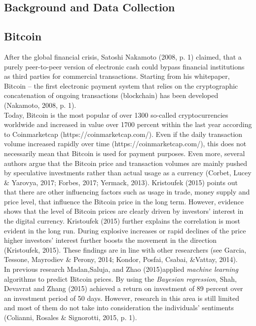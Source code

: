\documentclass[a4paper,american,12pt]{article}
\begin{document}
\begin{spacing}{1.2}
\clearpage

\section{Background and Data Collection}
\label{sec:Background}
\subsection{Bitcoin}
After the global financial crisis, Satoshi Nakamoto (2008, p. 1) claimed, that a purely peer-to-peer version of electronic cash could bypass financial institutions as third parties for commercial transactions. Starting from his whitepaper, Bitcoin – the first electronic payment system that relies on the cryptographic concatenation of ongoing transactions (blockchain) has been developed (Nakamoto, 2008, p. 1).\\

Today, Bitcoin is the most popular of over 1300 so-called cryptocurrencies worldwide and increased in value over 1700 percent within the last year according to Coinmarketcap (https://coinmarketcap.com/). Even if the daily transaction volume increased rapidly over time (https://coinmarketcap.com/), this does not necessarily mean that Bitcoin is used for payment purposes. Even more, several authors argue that the Bitcoin price and transaction volumes are mainly pushed by speculative investments rather than actual usage as a currency (Corbet, Lucey \& Yarovya, 2017; Forbes, 2017; Yermack, 2013). Kristoufek (2015) points out that there are other influencing factors such as usage in trade, money supply and price level, that influence the Bitcoin price in the long term. However, evidence shows that the level of Bitcoin prices are clearly driven by investors’ interest in the digital currency. Kristoufek (2015) further explains the correlation is most evident in the long run.  During explosive increases or rapid declines of the price higher investors’ interest further boosts the movement in the direction (Kristoufek, 2015). These findings are in line with other researchers (see Garcia, Tessone, Mayrodiev \& Perony, 2014; Kondor, Posfai, Csabai, \&Vattay, 2014).\\

In previous research Madan,Saluja, and Zhao (2015)applied \textit{machine learning} algorithms to predict Bitcoin prices. By using the \textit{Bayesian regression}, Shah, Devavrat and Zhang (2015) achieved a return on investment of 89 percent over an investment period of 50 days. However, research in this area is still limited and most of them do not take into consideration the individuals' sentiments (Colianni, Rosales \& Signorotti, 2015, p. 1).\\


\end{spacing}
\end{document}
